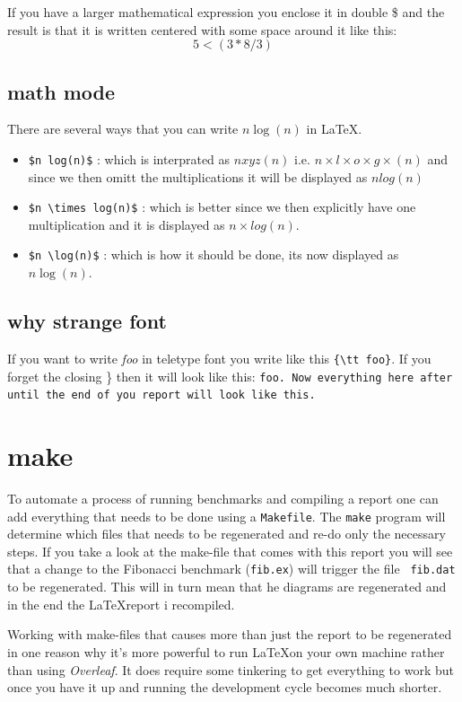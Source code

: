 \documentclass[a4paper,11pt]{article}
\begin{document}
If you have a larger mathematical expression you enclose it in double
\$ and the result is that it is written centered with some space
around it like this:  $$ 5 < (3 * 8 / 3 ) $$

\subsection{math mode}

There are several ways that you can write $n \log(n)$ in \LaTeX.

\begin{itemize}
\item {\tt \$n log(n)\$}  : which is interprated as $n xyz(n)$ i.e. $n \times l \times o \times g \times (n)$ and since we then omitt the multiplications it will be displayed as $n log(n)$

\item {\tt \$n \textbackslash times log(n)\$} : which is better since
  we then explicitly have one multiplication and it is displayed as
  $n \times log(n)$.

\item {\tt \$n \textbackslash log(n)\$} : which is how it should be
  done, its now displayed as $n \log(n)$.
\end{itemize}  



\subsection*{why strange font}

If you want to write {\em foo} in teletype font you write like this
\verb+{\tt foo}+. If you forget the closing \} then it will look like
this: {\tt foo. Now everything here after until the end of you report
  will look like this. }



\section*{make}

To automate a process of running benchmarks and compiling a report one
can add everything that needs to be done using a {\tt Makefile}. The
{\tt make} program will determine which files that needs to be
regenerated and re-do only the necessary steps. If you take a look at
the make-file that comes with this report you will see that a change
to the Fibonacci benchmark ({\tt fib.ex}) will trigger the file {\tt
  fib.dat} to be regenerated. This will in turn mean that he diagrams
are regenerated and in the end the \LaTeX report i recompiled.

Working with make-files that causes more than just the report to be
regenerated in one reason why it's more powerful to run \LaTeX on your
own machine rather than using {\em Overleaf}. It does require some
tinkering to get everything to work but once you have it up and running
the development cycle becomes much shorter.
\end{document}
